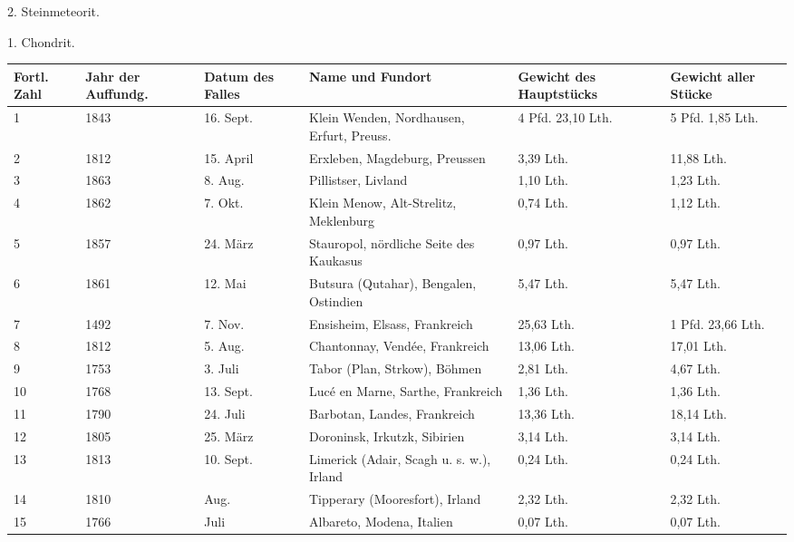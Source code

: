 \documentclass[a4paper, 11pt, oneside]{article}
\begin{document}
\clearpage
\begin{center}
2. Steinmeteorit.
\end{center}
\begin{center}
1. Chondrit.
\end{center}
\begin{center}
\begin{footnotesize}
\begin{tabular}{ |p{7mm}|p{7mm}|p{13mm}|p{48mm}|p{22mm}|p{22mm}| }
    \hline
    Fortl. Zahl & Jahr der Auffundg. & Datum des Falles & Name und Fundort & Gewicht des Hauptstücks & Gewicht aller Stücke\\
    \hline\hline
    1 & 1843 & 16. Sept. & Klein Wenden, Nordhausen, Erfurt, Preuss. & 4 Pfd. 23,10 Lth. & 5 Pfd. 1,85 Lth.\\\hline
    2 & 1812 & 15. April & Erxleben, Magdeburg, Preussen & 3,39 Lth. & 11,88 Lth.\\\hline
    3 & 1863 & 8. Aug. & Pillistser, Livland & 1,10 Lth. & 1,23 Lth.\\\hline
    4 & 1862 & 7. Okt. & Klein Menow, Alt-Strelitz, Meklenburg & 0,74 Lth. & 1,12 Lth.\\\hline
    5 & 1857 & 24. März & Stauropol, nördliche Seite des Kaukasus & 0,97 Lth. & 0,97 Lth.\\\hline
    6 & 1861 & 12. Mai & Butsura (Qutahar), Bengalen, Ostindien & 5,47 Lth. & 5,47 Lth.\\\hline
    7 & 1492 & 7. Nov. & Ensisheim, Elsass, Frankreich & 25,63 Lth. & 1 Pfd. 23,66 Lth.\\\hline
    8 & 1812 & 5. Aug. & Chantonnay, Vendée, Frankreich & 13,06 Lth. & 17,01 Lth.\\\hline
    9 & 1753 & 3. Juli & Tabor (Plan, Strkow), Böhmen & 2,81 Lth. & 4,67 Lth.\\\hline
    10 & 1768 & 13. Sept. & Lucé en Marne, Sarthe, Frankreich & 1,36 Lth. & 1,36 Lth.\\\hline
    11 & 1790 & 24. Juli & Barbotan, Landes, Frankreich & 13,36 Lth. & 18,14 Lth.\\\hline
    12 & 1805 & 25. März & Doroninsk, Irkutzk, Sibirien & 3,14 Lth. & 3,14 Lth.\\\hline
    13 & 1813 & 10. Sept. & Limerick (Adair, Scagh u. s. w.), Irland & 0,24 Lth. & 0,24 Lth.\\\hline
    14 & 1810 & Aug. & Tipperary (Mooresfort), Irland & 2,32 Lth. & 2,32 Lth.\\\hline
    15 & 1766 & Juli & Albareto, Modena, Italien & 0,07 Lth. & 0,07 Lth.\\\hline

\end{tabular}
\end{footnotesize}
\end{center}
\end{document}
